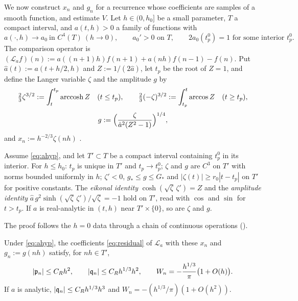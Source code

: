 We now construct $x_n$ and $g_n$ for a recurrence whose coefficients are samples of a
smooth function, and estimate $V$. Let $h\in(0,h_0]$ be a small parameter, $T$ a
compact interval, and $a(t,h)>0$ a family of functions with
\begin{equation}\label{eq:ahyp}
  a(\cdot,h)\to a_0\ \text{in }C^4(T)\ (h\to0),\qquad a_0'>0\text{ on }T,\qquad
  2a_0(t_p^0)=1\text{ for some interior }t_p^0 .
\end{equation}
The comparison operator is $(\mathcal L_af)(n):=a((n+1)h)f(n+1)+a(nh)f(n-1)-f(n)$. Put
$\hat a(t):=a(t+h/2,h)$ and $Z:=1/(2\hat a)$, let $t_p$ be the root of $Z=1$, and define
the Langer variable $\zeta$ and the amplitude $g$ by
\[
  \tfrac23\zeta^{3/2}:=\int_t^{t_p}\operatorname{arccosh} Z\quad(t\le t_p),\qquad
  \tfrac23(-\zeta)^{3/2}:=\int_{t_p}^t\arccos Z\quad(t\ge t_p),
\]
\[
  g:=\Bigl(\frac{\zeta}{\hat a^2(Z^2-1)}\Bigr)^{1/4},
\]
and $x_n:=h^{-2/3}\zeta(nh)$ \cite[(2.2)--(2.3)]{Geronimo2009}.

\begin{lemma}\label{lem:langer}
Assume \eqref{eq:ahyp}, and let $T'\subset T$ be a compact interval containing $t_p^0$ in
its interior. For $h\le h_0$: $t_p$ is unique in $T'$ and $t_p\to t_p^0$; $\zeta$ and $g$ are
$C^3$ on $T'$ with norms bounded uniformly in $h$; $\zeta'<0$, $g_*\le g\le G_*$ and
$|\zeta(t)|\ge r_0|t-t_p|$ on $T'$ for positive constants. The \emph{eikonal identity}
$\cosh(\sqrt\zeta\,\zeta')=Z$ and the \emph{amplitude identity}
$\hat a\,g^2\sinh(\sqrt\zeta\,\zeta')/\sqrt\zeta=-1$ hold on $T'$, read with $\cos$ and $\sin$
for $t>t_p$. If $a$ is real-analytic in $(t,h)$ near $T'\times\{0\}$, so are $\zeta$ and $g$.
\end{lemma}

\noindent The proof follows the $h=0$ data through a chain of continuous operations
().

\begin{lemma}\label{lem:R}
Under \eqref{eq:ahyp}, the coefficients \eqref{eq:residual} of $\mathcal L_a$ with these $x_n$
and $g_n:=g(nh)$ satisfy, for $nh\in T'$,
\[
  |\mathfrak{p}_n|\le C_Rh^2,\qquad|\mathfrak{q}_n|\le C_Rh^{1/3}h^2,\qquad W_n=-\frac{h^{1/3}}\pi\bigl(1+O(h)\bigr).
\]
If $a$ is analytic, $|\mathfrak{q}_n|\le C_Rh^{1/3}h^3$ and $W_n=-(h^{1/3}/\pi)(1+O(h^2))$.
\end{lemma}

